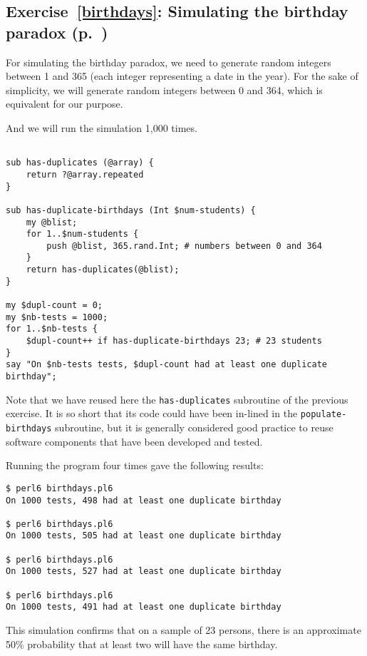 \subsection{Exercise~\ref{birthdays}: Simulating the birthday paradox (p.~\pageref{birthdays})}
\label{sol_birthdays}

For simulating the birthday paradox, we need to generate 
random integers between 1 and 365 (each integer 
representing a date in the year). For the sake of 
simplicity, we will generate random integers between 
0 and 364, which is equivalent for our purpose.

And we will run the simulation 1,000 times.

\begin{verbatim}

sub has-duplicates (@array) {
    return ?@array.repeated
}

sub has-duplicate-birthdays (Int $num-students) {
    my @blist;
    for 1..$num-students {
        push @blist, 365.rand.Int; # numbers between 0 and 364
    }
    return has-duplicates(@blist);
}

my $dupl-count = 0;
my $nb-tests = 1000;
for 1..$nb-tests {
    $dupl-count++ if has-duplicate-birthdays 23; # 23 students
}
say "On $nb-tests tests, $dupl-count had at least one duplicate birthday";
\end{verbatim}

Note that we have reused here the {\tt has-duplicates} 
subroutine of the previous exercise. It is so short 
that its code could have been in-lined in the 
\verb'populate-birthdays'  
subroutine, but it is 
generally considered good practice to reuse software 
components that have been developed and tested.

Running the program four times gave the following 
results:

\begin{verbatim}
$ perl6 birthdays.pl6
On 1000 tests, 498 had at least one duplicate birthday

$ perl6 birthdays.pl6
On 1000 tests, 505 had at least one duplicate birthday

$ perl6 birthdays.pl6
On 1000 tests, 527 had at least one duplicate birthday

$ perl6 birthdays.pl6
On 1000 tests, 491 had at least one duplicate birthday
\end{verbatim}

This simulation confirms that on a sample of 23 persons, 
there is an approximate 50\% probability that at least 
two will have the same birthday.

